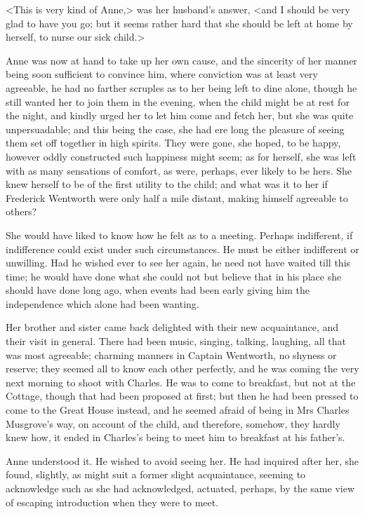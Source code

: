 <This is very kind of Anne,> was her husband's answer, <and I should be very glad to have you go; but it seems rather hard that she should be left at home by herself, to nurse our sick child.>

Anne was now at hand to take up her own cause, and the sincerity of her manner being soon sufficient to convince him, where conviction was at least very agreeable, he had no farther scruples as to her being left to dine alone, though he still wanted her to join them in the evening, when the child might be at rest for the night, and kindly urged her to let him come and fetch her, but she was quite unpersuadable; and this being the case, she had ere long the pleasure of seeing them set off together in high spirits. They were gone, she hoped, to be happy, however oddly constructed such happiness might seem; as for herself, she was left with as many sensations of comfort, as were, perhaps, ever likely to be hers. She knew herself to be of the first utility to the child; and what was it to her if Frederick Wentworth were only half a mile distant, making himself agreeable to others?

She would have liked to know how he felt as to a meeting. Perhaps indifferent, if indifference could exist under such circumstances. He must be either indifferent or unwilling. Had he wished ever to see her again, he need not have waited till this time; he would have done what she could not but believe that in his place she should have done long ago, when events had been early giving him the independence which alone had been wanting.

Her brother and sister came back delighted with their new acquaintance, and their visit in general. There had been music, singing, talking, laughing, all that was most agreeable; charming manners in Captain Wentworth, no shyness or reserve; they seemed all to know each other perfectly, and he was coming the very next morning to shoot with Charles. He was to come to breakfast, but not at the Cottage, though that had been proposed at first; but then he had been pressed to come to the Great House instead, and he seemed afraid of being in Mrs Charles Musgrove's way, on account of the child, and therefore, somehow, they hardly knew how, it ended in Charles's being to meet him to breakfast at his father's.

Anne understood it. He wished to avoid seeing her. He had inquired after her, she found, slightly, as might suit a former slight acquaintance, seeming to acknowledge such as she had acknowledged, actuated, perhaps, by the same view of escaping introduction when they were to meet.

